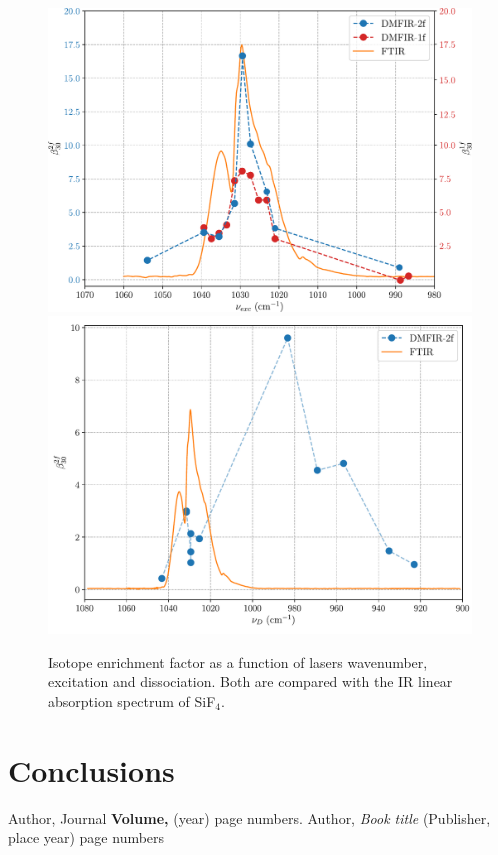 \documentclass[global,twocolumn]{svjour}
\begin{document}
\begin{figure}[h]
	\centering
	\includegraphics[width = 1\linewidth]{figures/beta_30_nu_bombeo.pdf}
	\includegraphics[width = 1\linewidth]{figures/beta_30_nu_diso.pdf}
	\caption{\label{fig:beta_spec} Isotope enrichment factor as a function of lasers wavenumber, excitation and dissociation. Both are compared with the IR linear absorption spectrum of SiF$_{4}$.}
\end{figure}

\section{Conclusions}

\begin{thebibliography}{}
	Author, Journal \textbf{Volume,} (year) page numbers.
	Author, \textit{Book title} (Publisher, place year) page numbers
\end{thebibliography}
	
	
\end{document}
